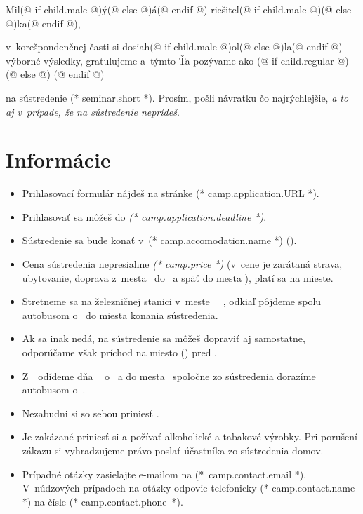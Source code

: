 Mil(@ if child.male @)ý(@ else @)á(@ endif @) riešiteľ(@ if child.male @)(@ else @)ka(@ endif @),

v~korešpondenčnej časti si dosiah(@ if child.male @)ol(@ else @)la(@ endif @) výborné výsledky,
gratulujeme a~týmto Ťa pozývame ako (@ if child.regular @) (@ else @) (@ endif @)

na sústredenie (* seminar.short *). Prosím, pošli návratku čo najrýchlejšie, \emph{a to aj v~prípade, že na sústredenie neprídeš}.

\section{Informácie}

\begin{itemize}
    \item Prihlasovací formulár nájdeš na stránke (* camp.application.URL *).
    \item Prihlasovať sa môžeš do \emph{(* camp.application.deadline *)}. 
    \item Sústredenie sa bude konať v~(* camp.accomodation.name *) ().
    \item Cena sústredenia nepresiahne \emph{(* camp.price *)} (v~cene je zarátaná strava, ubytovanie, doprava z~mesta \mestoZraz\ do \accomodation\ a späť do mesta \mestoRozchod), platí sa na mieste.
    \item Stretneme sa na železničnej stanici v~meste \emph{\mestoZraz\ \prichod\ \rok}, odkiaľ pôjdeme spolu autobusom o~\emph{\prichodCas} do miesta konania sústredenia.
    \item Ak sa inak nedá, na sústredenie sa môžeš dopraviť aj samostatne, odporúčame však príchod na miesto (\svp) pred \emph{\prichodSvp}.
    \item Z~\accomodation\ odídeme dňa \emph{\odchod\ \rok} o~\emph{\odchodSvp} a do mesta \mestoRozchod\ spoločne zo sústredenia dorazíme autobusom o~\emph{\odchodCas}.
    \item Nezabudni si so sebou priniesť \stuffToBring.
    \item Je zakázané priniesť si a požívať alkoholické a tabakové výrobky. Pri porušení zákazu si vyhradzujeme právo poslať účastníka zo sústredenia domov.
    \item Prípadné otázky zasielajte e-mailom na (* camp.contact.email *). V~núdzových prípadoch na otázky odpovie
        telefonicky (* camp.contact.name *) na čísle (* camp.contact.phone *).
\end{itemize}

